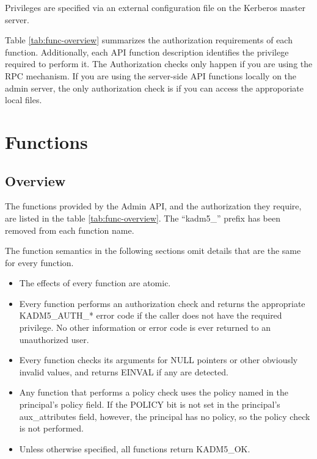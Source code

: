 Privileges are specified via an external configuration file on the
Kerberos master server.

Table \ref{tab:func-overview} summarizes the authorization
requirements of each function.  Additionally, each API function
description identifies the privilege required to perform it.  The
Authorization checks only happen if you are using the RPC mechanism.
If you are using the server-side API functions locally on the admin
server, the only authorization check is if you can access the
approporiate local files.

\section{Functions}

\subsection{Overview}

The functions provided by the Admin API, and the authorization they
require, are listed in the table \ref{tab:func-overview}.  The
``kadm5_'' prefix has been removed from each function name.

The function semantics in the following sections omit details that are
the same for every function.

\begin{itemize}
\item The effects of every function are atomic.

\item Every function performs an authorization check and returns
the appropriate KADM5_AUTH_* error code if the caller does not
have the required privilege.  No other information or error code is
ever returned to an unauthorized user.

\item Every function checks its arguments for NULL pointers or other
obviously invalid values, and returns EINVAL if any are detected.

\item Any function that performs a policy check uses the policy named
in the principal's policy field.  If the POLICY bit is not set in the
principal's aux_attributes field, however, the principal has no
policy, so the policy check is not performed.

\item Unless otherwise specified, all functions return KADM5_OK.
\end{itemize}

